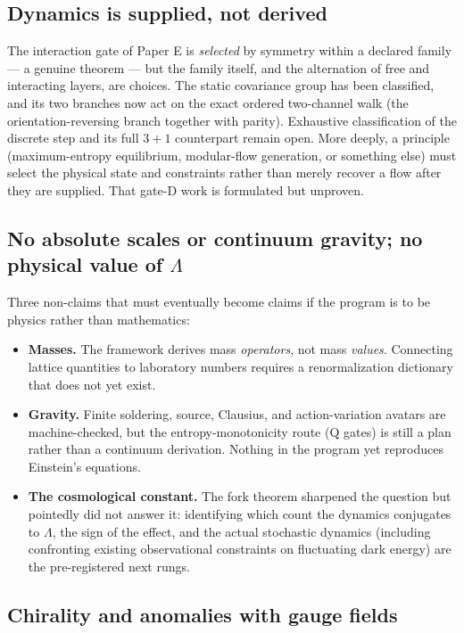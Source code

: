 \documentclass[11pt]{article}
\newcommand{\Lam}{\Lambda}
\begin{document}
\subsection{Dynamics is supplied, not derived}

The interaction gate of Paper E is \emph{selected} by symmetry within a
declared family --- a genuine theorem --- but the family itself, and the
alternation of free and interacting layers, are choices.  The static
covariance group has been classified, and its two branches now act on the
exact ordered two-channel walk (the orientation-reversing branch together
with parity).  Exhaustive classification of the discrete step and its full
$3+1$ counterpart remain open.  More deeply, a principle
(maximum-entropy equilibrium, modular-flow generation, or something else)
must select the physical state and constraints rather than merely recover a
flow after they are supplied.  That gate-D work is formulated but unproven.

\subsection{No absolute scales or continuum gravity; no physical value of $\Lam$}

Three non-claims that must eventually become claims if the program is to
be physics rather than mathematics:

\begin{itemize}
\item \textbf{Masses.}  The framework derives mass \emph{operators}, not
  mass \emph{values}.  Connecting lattice quantities to laboratory
  numbers requires a renormalization dictionary that does not yet exist.
\item \textbf{Gravity.}  Finite soldering, source, Clausius, and
  action-variation avatars are machine-checked, but the
  entropy-monotonicity route (Q gates) is still a plan rather than a
  continuum derivation.  Nothing in the program yet reproduces Einstein's
  equations.
\item \textbf{The cosmological constant.}  The fork theorem sharpened the
  question but pointedly did not answer it: identifying which count the
  dynamics conjugates to $\Lam$, the sign of the effect, and the actual
  stochastic dynamics (including confronting existing observational
  constraints on fluctuating dark energy) are the pre-registered next
  rungs.
\end{itemize}

\subsection{Chirality and anomalies with gauge fields}
\end{document}
